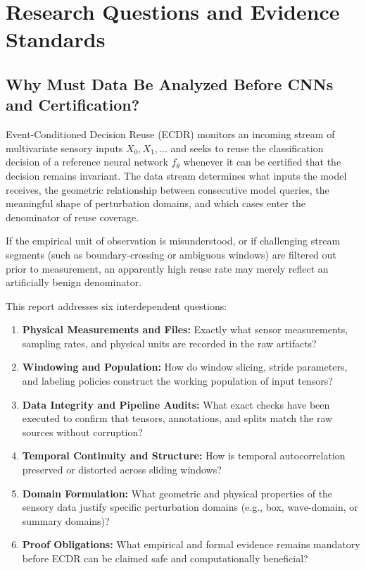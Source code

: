 \documentclass[11pt,a4paper]{article}
\theoremstyle{definition}
\begin{document}
\begingroup\small\setlength{\parskip}{0pt}\tableofcontents\endgroup
\clearpage

\section{Research Questions and Evidence Standards}

\subsection{Why Must Data Be Analyzed Before CNNs and Certification?}
Event-Conditioned Decision Reuse (ECDR) monitors an incoming stream of multivariate sensory inputs $X_0, X_1, \ldots$ and seeks to reuse the classification decision of a reference neural network $f_\theta$ whenever it can be certified that the decision remains invariant. The data stream determines what inputs the model receives, the geometric relationship between consecutive model queries, the meaningful shape of perturbation domains, and which cases enter the denominator of reuse coverage.

If the empirical unit of observation is misunderstood, or if challenging stream segments (such as boundary-crossing or ambiguous windows) are filtered out prior to measurement, an apparently high reuse rate may merely reflect an artificially benign denominator.

This report addresses six interdependent questions:
\begin{enumerate}[label=\textbf{(D\arabic*)}]
\item \textbf{Physical Measurements and Files:} Exactly what sensor measurements, sampling rates, and physical units are recorded in the raw artifacts?
\item \textbf{Windowing and Population:} How do window slicing, stride parameters, and labeling policies construct the working population of input tensors?
\item \textbf{Data Integrity and Pipeline Audits:} What exact checks have been executed to confirm that tensors, annotations, and splits match the raw sources without corruption?
\item \textbf{Temporal Continuity and Structure:} How is temporal autocorrelation preserved or distorted across sliding windows?
\item \textbf{Domain Formulation:} What geometric and physical properties of the sensory data justify specific perturbation domains (e.g., box, wave-domain, or summary domains)?
\item \textbf{Proof Obligations:} What empirical and formal evidence remains mandatory before ECDR can be claimed safe and computationally beneficial?
\end{enumerate}
\end{document}
